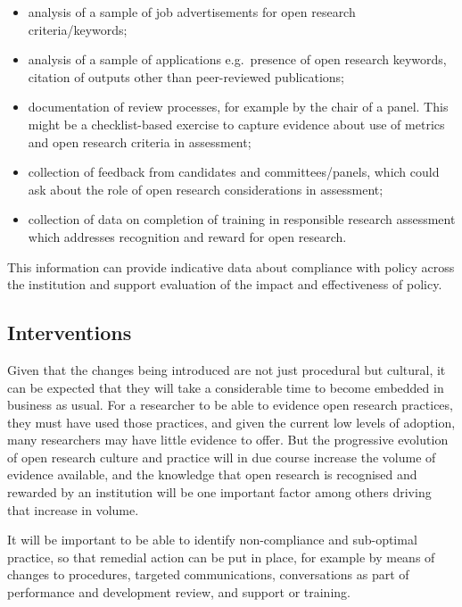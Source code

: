 \documentclass[
  letterpaper,
  DIV=11,
  numbers=noendperiod,
  oneside]{scrreprt}
\begin{document}
\begin{itemize}
\item
  analysis of a sample of job advertisements for open research
  criteria/keywords;
\item
  analysis of a sample of applications e.g.~presence of open research
  keywords, citation of outputs other than peer-reviewed publications;
\item
  documentation of review processes, for example by the chair of a
  panel. This might be a checklist-based exercise to capture evidence
  about use of metrics and open research criteria in assessment;
\item
  collection of feedback from candidates and committees/panels, which
  could ask about the role of open research considerations in
  assessment;
\item
  collection of data on completion of training in responsible research
  assessment which addresses recognition and reward for open research.
\end{itemize}

This information can provide indicative data about compliance with
policy across the institution and support evaluation of the impact and
effectiveness of policy.

\subsection{Interventions}\label{interventions}

Given that the changes being introduced are not just procedural but
cultural, it can be expected that they will take a considerable time to
become embedded in business as usual. For a researcher to be able to
evidence open research practices, they must have used those practices,
and given the current low levels of adoption, many researchers may have
little evidence to offer. But the progressive evolution of open research
culture and practice will in due course increase the volume of evidence
available, and the knowledge that open research is recognised and
rewarded by an institution will be one important factor among others
driving that increase in volume.

It will be important to be able to identify non-compliance and
sub-optimal practice, so that remedial action can be put in place, for
example by means of changes to procedures, targeted communications,
conversations as part of performance and development review, and support
or training.

\end{document}
